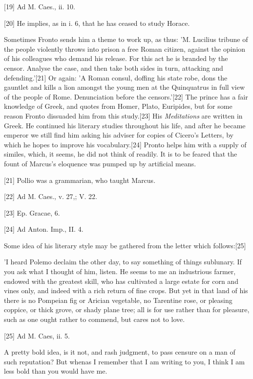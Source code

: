 [19]
Ad M. Caes., ii. 10.

[20]
He implies, as in i. 6, that he has ceased to study Horace.

Sometimes Fronto sends him a theme to work up, as thus: 'M. Lucilius
tribune of the people violently throws into prison a free Roman citizen,
against the opinion of his colleagues who demand his release. For this act
he is branded by the censor. Analyse the case, and then take both sides in
turn, attacking and defending.'[21]
Or again: 'A Roman consul, doffing his state robe, dons the gauntlet and
kills a lion amongst the young men at the Quinquatrus in full view of the
people of Rome. Denunciation before the censors.'[22]
The prince has a fair knowledge of Greek, and quotes from Homer, Plato,
Euripides, but for some reason Fronto dissuaded him from this
study.[23]
His \emph{Meditations} are written in Greek. He continued his literary studies
throughout his life, and after he became emperor we still find him asking
his adviser for copies of Cicero's Letters, by which he hopes to improve
his vocabulary.[24]
Pronto helps him with a supply of similes, which, it seems, he did not
think of readily. It is to be feared that the fount of Marcus's eloquence
was pumped up by artificial means.

[21]
Pollio was a grammarian, who taught Marcus.

[22]
Ad M. Caes., v. 27,; V. 22.

[23]
Ep. Gracae, 6.

[24]
Ad Anton. Imp., II. 4.

Some idea of his literary style may be gathered from the letter which
follows:[25]

'I heard Polemo declaim the other day, to say something of things
sublunary. If you ask what I thought of him, listen. He seems to me an
industrious farmer, endowed with the greatest skill, who has cultivated a
large estate for corn and vines only, and indeed with a rich return of
fine crops. But yet in that land of his there is no Pompeian fig or
Arician vegetable, no Tarentine rose, or pleasing coppice, or thick
grove, or shady plane tree; all is for use rather than for pleasure, such
as one ought rather to commend, but cares not to love.

[25]
Ad M. Caes, ii. 5.

A pretty bold idea, is it not, and rash judgment, to pass censure on a man
of such reputation? But whenas I remember that I am writing to you, I
think I am less bold than you would have me.

